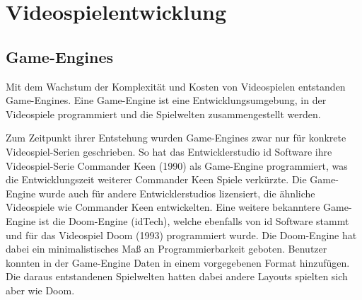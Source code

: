 


\lstset{style=mystyle}

\chapter{Videospielentwicklung}
\label{chap:videospielentwicklung}



\section{Game-Engines}
\label{chap:game engines}

Mit dem Wachstum der Komplexit\"{a}t und Kosten von Videospielen entstanden Game-Engines. Eine Game-Engine ist eine Entwicklungsumgebung, in der Videospiele programmiert und die Spielwelten zusammengestellt werden. 

Zum Zeitpunkt ihrer Entstehung wurden Game-Engines zwar nur f\"{u}r konkrete Videospiel-Serien geschrieben. So hat das Entwicklerstudio id Software ihre Videospiel-Serie Commander Keen (1990) als Game-Engine programmiert, was die Entwicklungszeit weiterer Commander Keen Spiele verk\"{u}rzte. Die Game-Engine wurde auch f\"{u}r andere Entwicklerstudios lizensiert, die \"{a}hnliche Videospiele wie Commander Keen entwickelten. Eine weitere bekanntere Game-Engine ist die Doom-Engine (idTech), welche ebenfalls von id Software stammt und f\"{u}r das Videospiel Doom (1993) programmiert wurde. Die Doom-Engine hat dabei ein minimalistisches Ma\ss{} an Programmierbarkeit geboten. Benutzer konnten in der Game-Engine Daten in einem vorgegebenen Format hinzuf\"{u}gen. Die daraus entstandenen Spielwelten hatten dabei andere Layouts spielten sich aber wie Doom.\autocite{lewis2002game}

